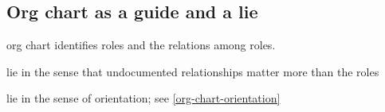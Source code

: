 \subsection{Org chart as a guide and a lie}

org chart identifies roles and the relations among roles. 

lie in the sense that undocumented relationships matter more than the roles

lie in the sense of orientation; see \ref{org-chart-orientation}
